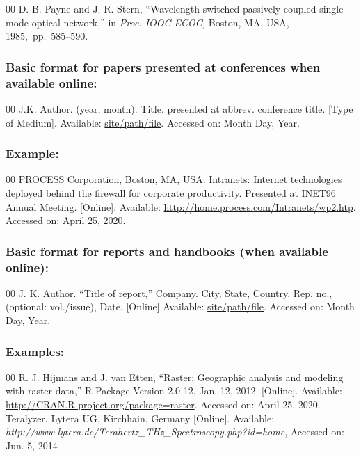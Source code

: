\documentclass{ieeeojpel}
\begin{document}
\begin{thebibliography}{00}
 D. B. Payne and J. R. Stern, ``Wavelength-switched
passively coupled single-mode optical network,'' in \textit{Proc. IOOC-ECOC, }Boston, MA, USA, 1985,~pp.~585--590.
\end{thebibliography}

\subsubsection*{Basic format for papers presented at conferences when available online: }

\begin{thebibliography}{00}
 J.K. Author. (year, month). Title. presented at abbrev. conference title.
[Type of Medium]. Available: \underline{site/path/file}. Accessed on: Month Day, Year.
\end{thebibliography}

\subsubsection*{Example:}

\begin{thebibliography}{00}
 PROCESS Corporation, Boston, MA, USA. Intranets: Internet technologies deployed behind the firewall for corporate productivity. Presented at INET96 Annual Meeting. [Online]. Available: \underline {http://home.process.com/Intranets/wp2.htp}. Accessed on: April 25, 2020.
\end{thebibliography}

\subsubsection*{Basic format for reports and handbooks (when available online): }

\begin{thebibliography}{00}
 J. K. Author. ``Title of report,'' Company. City, State, Country. Rep. no.,
(optional: vol./issue), Date. [Online] Available:
\underline{site/path/file}. Accessed
on: Month Day, Year.
\end{thebibliography}

\subsubsection*{Examples:}

\begin{thebibliography}{00}
 R. J. Hijmans and J. van Etten, ``Raster: Geographic analysis and modeling with raster data,'' R Package Version 2.0-12, Jan. 12, 2012. [Online]. Available: \underline {http://CRAN.R-project.org/package=raster}. Accessed on: April 25, 2020.
 Teralyzer. Lytera UG, Kirchhain, Germany [Online]. Available: \emph{http://www.lytera.de/Terahertz\_THz\_Spectroscopy.php?id=home}, Accessed on: Jun. 5, 2014
\end{thebibliography}
\end{document}
